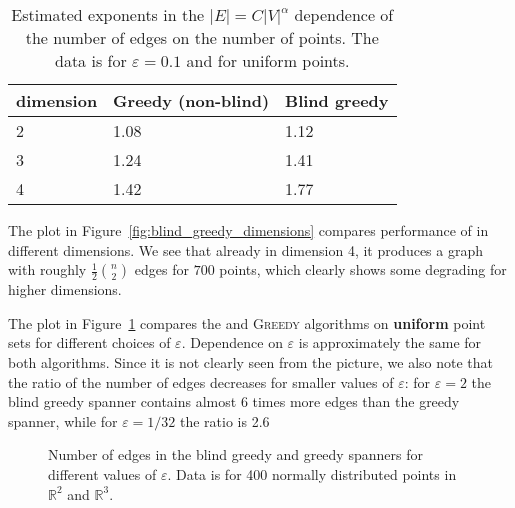 \documentclass[]{ws-ijcga}
\newcommand{\eps}{\varepsilon}
\newcommand{\RR}{\mathbb{R}}
\def \expDistDataPath {./}
\begin{document}
\begin{table}[b]
\begin{tabular}{|l|l|l|}
\hline
dimension & \textbf{Greedy (non-blind)} & \textbf{Blind greedy} \\ \hline
2         &         1.08                &  1.12                 \\ \hline
3         &         1.24                &  1.41                \\ \hline
4         &         1.42                &  1.77                 \\ \hline
\end{tabular}
\caption{Estimated exponents in the $|E|= C |V|^\alpha$ dependence of the number of edges
on the number of points. The data is for $\eps = 0.1$ and for uniform points.}
\label{tbl:regr_coeff_spanner}
\end{table}


The plot in Figure~\ref{fig:blind_greedy_dimensions}
compares performance of \bgrdy in different dimensions.
We see that already in dimension 4, it produces a graph with roughly $\frac{1}{2}\binom{n}{2}$
edges for $700$ points, which clearly shows some degrading for higher dimensions.


The plot in Figure~\ref{fig:spanner_eps_dependence}
compares the \bgrdy and \textsc{Greedy} algorithms
on \textbf{uniform} point sets for different choices of $\eps$. Dependence on $\eps$
is approximately the same for both algorithms. Since it is not clearly seen from the picture, we also note
that the ratio of the number of edges decreases for
smaller values of $\eps$: 
for $\eps = 2$ the blind greedy spanner contains almost 6 times more edges than the greedy spanner,
while for $\eps = 1/32$ the ratio is 2.6


\begin{figure}[ht]
        \caption{Number of edges in the blind greedy and greedy spanners for different values of $\eps$. Data is for 400 normally distributed points in $\RR^2$ and $\RR^3$.}
        \label{fig:spanner_eps_dependence}
\end{figure}
\end{document}
